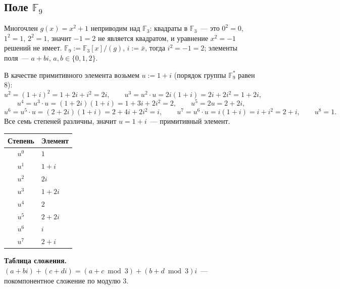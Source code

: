 \documentclass[12pt,a4paper]{article}
\begin{document}
    \subsection*{Поле $\mathbb{F}_9$}
    
    \begin{example}
    	Многочлен $g(x) = x^2+1$ неприводим над $\mathbb{F}_3$: квадраты в $\mathbb{F}_3$~--- это $0^2=0$, $1^2=1$, $2^2=1$, значит $-1=2$ не является квадратом, и уравнение $x^2=-1$ решений не имеет. $\mathbb{F}_9 := \mathbb{F}_3[x]/(g)$, $i := \bar x$, тогда $i^2 = -1 = 2$; элементы поля~--- $a+bi$, $a,b \in \{0,1,2\}$.
    
    	В качестве примитивного элемента возьмем $u := 1+i$ (порядок группы $\mathbb{F}_9^*$ равен $8$):
    	\[
    		u^2 = (1+i)^2 = 1+2i+i^2 = 2i,\qquad u^3 = u^2 \cdot u = 2i(1+i) = 2i+2i^2 = 1+2i,
    	\]
    	\[
    		u^4 = u^3\cdot u = (1+2i)(1+i) = 1+3i+2i^2 = 2,\qquad u^5 = 2u = 2+2i,
    	\]
    	\[
    		u^6 = u^5\cdot u = (2+2i)(1+i)=2+4i+2i^2=i,\qquad u^7 = u^6 \cdot u = i(1+i)=i+i^2=2+i,\qquad u^8=1.
    	\]
    	Все семь степеней различны, значит $u=1+i$~--- примитивный элемент.
    \end{example}
    
    \begin{center}
    	\begin{xltabular}{0.7\textwidth}{|c|X|}
    		\hline
    		\textbf{Степень} & \textbf{Элемент}\\
    		\hline
    		$u^0$ & $1$\\
    		\hline
    		$u^1$ & $1+i$\\
    		\hline
    		$u^2$ & $2i$\\
    		\hline
    		$u^3$ & $1+2i$\\
    		\hline
    		$u^4$ & $2$\\
    		\hline
    		$u^5$ & $2+2i$\\
    		\hline
    		$u^6$ & $i$\\
    		\hline
    		$u^7$ & $2+i$\\
    		\hline
    	\end{xltabular}
    \end{center}
    
    \noindent\textbf{Таблица сложения.} $(a+bi)+(c+di) = (a+c \bmod 3) + (b+d \bmod 3)i$~--- покомпонентное сложение по модулю $3$.
    
\end{document}

